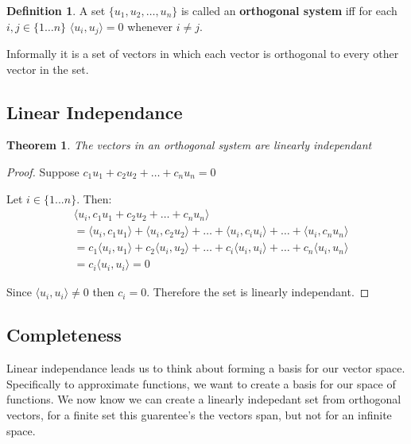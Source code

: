 \documentclass{article}
\newtheorem{theorem}{Theorem}
\theoremstyle{definition}
\newtheorem{definition}{Definition}
\theoremstyle{definition}
\begin{document}
\begin{definition}
    A set $\{u_{1}, u_{2}, \ldots, u_{n} \}$ is called an \textbf{orthogonal system} iff for each $i,j\in \{ 1 \ldots n \}$  $\langle u_{i}, u_{j} \rangle=0$ whenever $i\neq j$.

\end{definition}
Informally it is a set of vectors in which each vector is orthogonal to every other vector in the set.

\subsection{Linear Independance}

\begin{theorem}
    The vectors in an orthogonal system are linearly independant
\end{theorem}

\begin{proof}
    Suppose $c_{1}u_{1}+c_{2}u_{2}+\ldots+c_{n}u_{n}=0$

    Let $i\in \{ 1...n \}$. Then:
    \begin{equation}
        \begin{split}
            &\langle u_{i}, c_{1}u_{1} + c_{2}u_{2} + \ldots + c_{n}u_{n} \rangle \\ 
            &= \langle u_{i}, c_{1}u_{1} \rangle + \langle u_{i}, c_{2}u_{2} \rangle + \ldots + \langle u_{i}, c_{i}u_{i} \rangle + \ldots + \langle u_{i}, c_{n}u_{n} \rangle \\
            &= c_{1}\langle u_{i}, u_{1} \rangle + c_{2}\langle u_{i}, u_{2} \rangle + \ldots + c_{i}\langle u_{i}, u_{i} \rangle + \ldots + c_{n}\langle u_{i}, u_{n} \rangle \\
            &= c_{i}\langle u_{i}, u_{i} \rangle=0 
        \end{split}
    \end{equation}

    Since $\langle u_{i}, u_{i} \rangle \neq 0$ then $c_{i}=0$.
    Therefore the set is linearly independant.
\end{proof}

\subsection{Completeness}

Linear independance leads us to think about forming a basis for our vector space. Specifically to approximate functions, we want to create a basis for our space of functions. We now know we can create a linearly indepedant set from orthogonal vectors, for a finite set this guarentee's the vectors span, but not for an infinite space.
\end{document}
